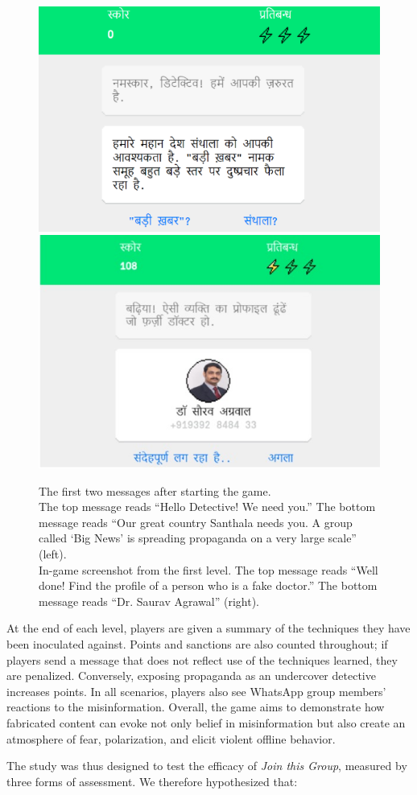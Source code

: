 \documentclass[empirical, authordate]{jote-new-article}
\begin{document}
\begin{figure}[t]

  \begin{fullwidth}
    \centering
    \includegraphics[height=.3\linewidth]{media/image3a.jpeg}
    \includegraphics[height=.3\linewidth]{media/image3b.jpg}
    \caption{The first two messages after starting the game. \\The top message reads “Hello Detective! We need you.” The bottom message reads “Our great country Santhala needs you. A group called ‘Big News' is spreading propaganda on a very large scale” (left). \\In-game screenshot from the first level. The top message reads “Well done! Find the profile of a person who is a fake doctor.” The bottom message reads “Dr. Saurav Agrawal” (right).}
    \label{fig:figure3}
  \end{fullwidth}
\end{figure}



At the end of each level, players are given a summary of the techniques they have been inoculated against. Points and sanctions are also counted throughout; if players send a message that does not reflect use of the techniques learned, they are penalized. Conversely, exposing propaganda as an undercover detective increases points. In all scenarios, players also see \mbox{WhatsApp} group members' reactions to the misinformation. Overall, the game aims to demonstrate how fabricated content can evoke not only belief in misinformation but also create an atmosphere of fear, polarization, and elicit violent offline behavior.

The study was thus designed to test the efficacy of \emph{Join this Group}, measured by three forms of assessment. We therefore hypothesized that:
\end{document}
